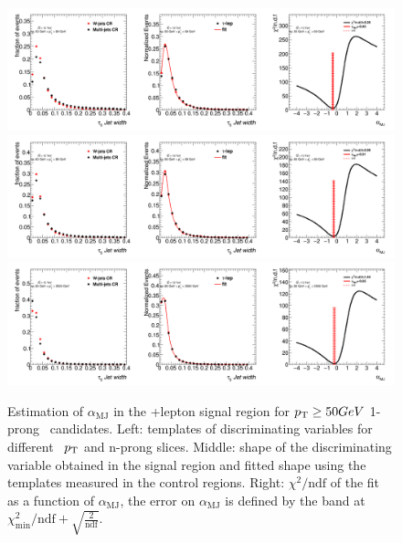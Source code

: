 	\begin{figure}
	\begin{center}
	\includegraphics[width=1\textwidth]{chapters/chapter6_HPlus/images/FFs/FFs_FIT_SR_TAULEP_1_50_60.png}
	\includegraphics[width=1\textwidth]{chapters/chapter6_HPlus/images/FFs/FFs_FIT_SR_TAULEP_1_60_80.png}
	\includegraphics[width=1\textwidth]{chapters/chapter6_HPlus/images/FFs/FFs_FIT_SR_TAULEP_1_80_3500.png}
	\end{center}
	\caption{
	Estimation of $\alpha_\mathrm{MJ}$ in the \tauhad+lepton signal region for $p_{\text{T}} \geq 50 GeV$
	1-prong \tauhad\ candidates. Left: templates of discriminating variables for different \tauhad\ $p_{\text{T}}$
	and n-prong slices. Middle: shape of the discriminating variable obtained in the signal region and fitted
	shape using the templates measured in the control regions. Right: $\chi^2/\mathrm{ndf}$ of the fit as a
	function of $\alpha_\mathrm{MJ}$, the error on $\alpha_\mathrm{MJ}$ is defined by the band at
	$\chi^2_\mathrm{min}/\mathrm{ndf}+\sqrt{\frac{2}{\mathrm{ndf}}}$.
	}
	\label{fig:mm:Fits:region7_2}
	\end{figure}



